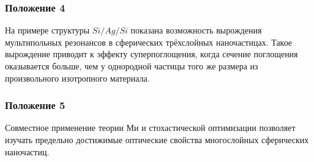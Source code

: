 \documentclass[14pt]{beamer}
\begin{document}
\begin{frame}
\begin{minipage}[ht]{0.49\linewidth}
  \end{minipage}
\end{frame}

\begin{frame}
  \frametitle{Положение 4}
  \begin{center}  На примере структуры $Si/Ag/Si$ показана возможность
    вырождения мультипольных резонансов в сферических трёхслойных
    наночастицах. Такое вырождение приводит к эффекту суперпоглощения,
    когда сечение поглощения оказывается больше, чем у однородной
    частицы того же размера из произвольного изотропного материала.
  \end{center}
\end{frame}
\begin{frame}
  \frametitle{Положение 5}
  \begin{center}
    Совместное применение теории Ми и стохастической оптимизации
    позволяет изучать предельно достижимые оптические свойства многослойных
    сферических наночастиц.
  \end{center}
\end{frame}
\end{document}
